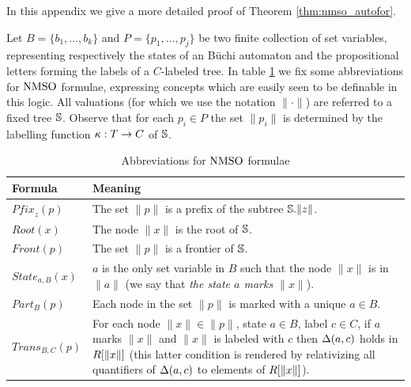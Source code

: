 \noindent




In this appendix we give a more detailed proof of Theorem \ref{thm:nmso_autofor}.

\begin{definition} Let $B = \{b_1,\dots,b_k\}$ and $P = \{p_1,\dots,p_j\}$ be two finite collection of set variables, representing respectively the states of an B\"{u}chi automaton and the propositional letters forming the labels of a $C$-labeled tree. In table \ref{fig:tableWFMSOFormulae} we fix some abbreviations for $\mathrm{NMSO}$ formulae, expressing concepts which are easily seen to be definable in this logic. All valuations (for which we use the notation $\|\cdot\|$) are referred to a fixed tree $\mathbb{S}$. Observe that for each $p_i \in P$ the set $\|p_i\|$ is determined by the labelling function $\kappa:T\rightarrow C$ of $\mathbb{S}$.

\begin{table}[ht]\centering
\begin{tabular}{|p{1.8cm}|p{11.5cm}|}
\hline
\textbf{Formula} & \textbf{Meaning} \\ \hline \hline
$\mathit{Pfix}_z(p)$ & The set $\|p\|$ is a prefix of the subtree $\mathbb{S}.{\|z\|}$. \\
\hline
$\mathit{Root}(x)$ & The node $\|x\|$ is the root of $\mathbb{S}$. \\
\hline
$\mathit{Front}(p)$ & The set $\|p\|$ is a frontier of $\mathbb{S}$. \\
\hline
$\mathit{State}_{a,B}(x)$ & $a$ is the only set variable in $B$ such that the node $\|x\|$ is in $\|a\|$ (we say that \emph{the state $a$ marks $\|x\|$}). \\
 \hline
$\mathit{Part}_B(p)$ & Each node in the set $\|p\|$ is marked with a unique $a \in B$. \\
\hline
$\mathit{Trans}_{B,C}(p)$ & For each node $\|x\| \in \|p\|$, state $a \in B$, label $c\in C$, if $a$ marks $\|x\|$ and $\|x\|$ is labeled with $c$ then $\Delta(a,c)$ holds in $R[\|x\|]$ (this latter condition is rendered by relativizing all quantifiers of $\Delta(a,c)$ to elements of $R[\|x\|]$). \\
\hline
\end{tabular}
\label{fig:tableWFMSOFormulae}\caption{{Abbreviations for $\mathrm{NMSO}$ formulae}}\end{table}


\end{definition}
